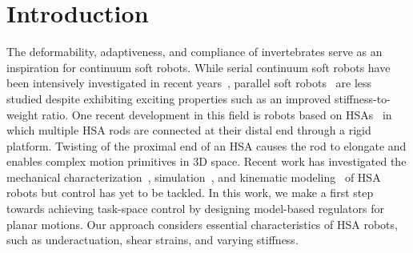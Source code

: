 \section{Introduction}
The deformability, adaptiveness, and compliance of invertebrates serve as an inspiration for continuum soft robots.
While serial continuum soft robots have been intensively investigated in recent years~\cite{della2023model}, parallel soft robots~\cite{hughes2020extensible} %
are less studied despite exhibiting exciting properties such as an improved stiffness-to-weight ratio. 
One recent development in this field is robots based on \glspl{HSA}~\cite{truby2021recipe, kaarthik2022motorized, stolzle2024guiding} in which multiple \gls{HSA} rods are connected at their distal end through a rigid platform. 
Twisting of the proximal end of an \gls{HSA} %
causes the rod to elongate 
and enables complex motion primitives in 3D space.
Recent work has investigated 
the mechanical characterization~\cite{good2022expanding}, simulation~\cite{stolzle2023modelling}, and kinematic modeling~\cite{garg2022kinematic, stolzle2023modelling} of \gls{HSA} robots but control has yet to be tackled.
In this work, we make a first step towards achieving task-space control by designing model-based regulators for planar motions. Our approach considers essential characteristics of \gls{HSA} robots, such as underactuation, shear strains, and varying stiffness. %

